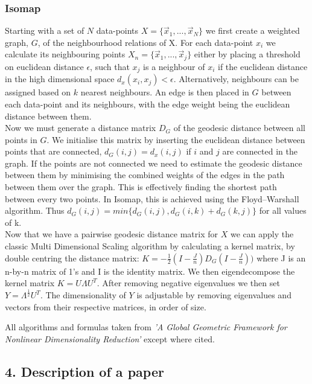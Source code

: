 \documentclass{article}
\begin{document}
\subsubsection{Isomap}
Starting with a set of $N$ data-points $X = \{\vec{x}_1,...,\vec{x}_N\}$ we first create a weighted graph, $G$, of the neighbourhood relations of X. For each data-point $x_i$ we calculate its neighbouring points $X_n = \{\vec{x}_1,...,\vec{x}_j\}$ either by placing a threshold on euclidean distance $\epsilon$, such that $x_j$ is a neighbour of $x_i$ if the euclidean distance in the high dimensional space $d_x(x_i,x_j) < \epsilon$. Alternatively, neighbours can be assigned based on $k$ nearest neighbours. An edge is then placed in $G$ between each data-point and its neighbours, with the edge weight being the euclidean distance between them. \\
Now we must generate a distance matrix $D_G$ of the geodesic distance between all points in $G$. We initialise this matrix by inserting the euclidean distance between points that are connected, $d_G(i,j) = d_x(i,j)$ if $i$ and $j$ are connected in the graph. If the points are not connected we need to estimate the geodesic distance between them by minimising the combined weights of the edges in the path between them over the graph. This is effectively finding the shortest path between every two points. In Isomap, this is achieved using the Floyd–Warshall algorithm.\cite{floyd1962algorithm} Thus $ d_G(i,j) = min\{d_G(i,j),d_G(i,k) + d_G(k,j)\}$ for all values of k. \\
Now that we have a pairwise geodesic distance matrix for $X$ we can apply the classic Multi Dimensional Scaling algorithm by calculating a kernel matrix, by double centring the distance matrix: $K = -\frac{1}{2}(I - \frac{J}{n})D_G(I-\frac{J}{n}))$ where J is an n-by-n matrix of 1's and I is the identity matrix. We then eigendecompose the kernel matrix $K = U\Lambda U^T$. After removing negative eigenvalues we then set $Y = \Lambda^{\frac{1}{2}}U^T$. The dimensionality of $Y$ is adjustable by removing eigenvalues and vectors from their respective matrices, in order of size.

All algorithms and formulas taken from \textit{'A Global Geometric Framework for Nonlinear Dimensionality Reduction'}\cite{tenenbaum2000global} except where cited.

\subsection{4. Description of a paper}
{}

\end{document}

